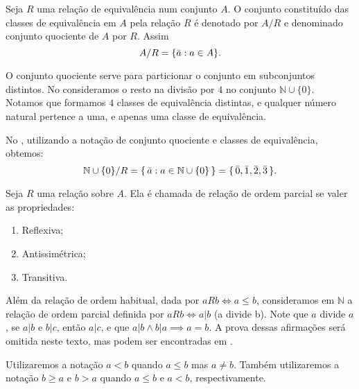 \documentclass[../main.tex]{subfiles}
\begin{document}
\begin{defi}\label{agb-def-conjuntoQuociente}
    Seja $R$ uma relação de equivalência num conjunto $A$. O conjunto constituído das classes de equivalência em $A$ pela relação $R$ é denotado por $A / R$ e denominado conjunto quociente de $A$ por $R$. Assim
    \[ A / R = \{\Bar{a} : a \in A\}. \]
    
\end{defi}
O conjunto quociente serve para particionar o conjunto em subconjuntos distintos. No  consideramos o resto na divisão por $4$ no conjunto $\mathbb{N} \cup \{0\}$. Notamos que formamos $4$ classes de equivalência distintas, e qualquer número natural pertence a uma, e apenas uma classe de equivalência.

\begin{ex}
    No , utilizando a notação de conjunto quociente e classes de equivalência, obtemos:
    \[ \mathbb{N} \cup \{0\} / R = \{\, \Bar{a} : a \in \mathbb{N} \cup \{0\} \,\} = \{\, \Bar{0}, \Bar{1}, \Bar{2}, \Bar{3} \,\}.\]
\end{ex}

\begin{defi}\label{agb-def-relacaoOrdemParcial}
    Seja $R$ uma relação sobre $A$. Ela é chamada de relação de ordem parcial se valer as propriedades:
    \begin{enumerate}[label=(\roman*)]
        \item Reflexiva;
        \item Antissimétrica;
        \item Transitiva.
    \end{enumerate}
\end{defi}

Além da relação de ordem habitual, dada por $aRb \iff a \leq b$, consideramos em $\mathbb{N}$ a relação de ordem parcial definida por $a R b \iff a | b$ (a divide b). Note que $a$ divide $a$, se $a | b$ e $b | c$, então $a | c$, e que $a | b \land b | a \implies a=b$. A prova dessas afirmações será omitida neste texto, mas podem ser encontradas em \textcite[p. 52]{domingues-2009}.

\begin{notacao}
    Utilizaremos a notação $a < b$ quando $a \leq b$ mas $a \neq b$. Também utilizaremos a notação $b \geq a$ e $b > a$ quando $a \leq b$ e $a < b$, respectivamente.
\end{notacao}
\end{document}
